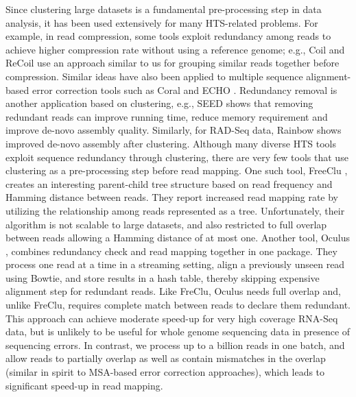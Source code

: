 \documentclass[a4paper]{article}
\begin{document}
Since clustering large datasets
is a fundamental pre-processing step in data analysis, it has been  used extensively for many HTS-related
problems.
For example, in read compression, some tools exploit redundancy among reads to
achieve higher compression rate without using a reference genome; e.g.,
Coil \cite{18489794} and ReCoil \cite{21988957} use an approach similar to
us for grouping similar reads together before compression.
Similar ideas have also been applied to multiple sequence alignment-based
error correction tools such as Coral \cite{citeulike:9110954} and ECHO \cite{citeulike:9144429}.
Redundancy removal is another application based on clustering, e.g., SEED \cite{Bao:2011ia}
shows that removing redundant reads can improve running time, reduce memory
requirement and improve de-novo assembly quality. Similarly, for RAD-Seq data,
Rainbow \cite{ChongRW12} shows improved de-novo assembly after clustering.
Although many diverse HTS tools exploit sequence redundancy through clustering, there are very few tools that use clustering as a pre-processing step before
read mapping. One such tool, FreeClu \cite{Qu01072009}, creates an interesting parent-child
tree structure based on read frequency and Hamming
distance between reads. They report increased read mapping rate by utilizing
the relationship among reads represented as a tree. Unfortunately, their algorithm is not
scalable to large datasets, and also restricted to full overlap between reads allowing a Hamming distance of at most one.
Another tool, Oculus \cite{23148484}, combines redundancy check and read mapping together in one package.
They process one read at a time in a streaming setting,  align a  previously unseen read using Bowtie, and store results in a hash table, thereby skipping expensive alignment step for redundant reads.
Like FreClu, Oculus needs full overlap and, unlike FreClu, requires complete match between reads to declare them redundant.
This approach can achieve moderate speed-up for very high coverage RNA-Seq data,
but is unlikely to be useful for whole genome sequencing data in presence of sequencing errors. In contrast, we process
up to a billion reads in one batch, and allow reads to partially overlap as well as contain
mismatches in the overlap (similar in spirit to MSA-based error correction approaches),
which leads to significant speed-up in read mapping.
\end{document}
